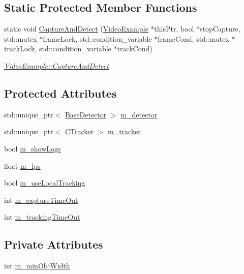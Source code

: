 \subsection*{Static Protected Member Functions}
\begin{DoxyCompactItemize}
\item 
static void \mbox{\hyperlink{class_video_example_ace8617201da40b6e230bd6c049b48aa0}{Capture\+And\+Detect}} (\mbox{\hyperlink{class_video_example}{Video\+Example}} $\ast$this\+Ptr, bool $\ast$stop\+Capture, std\+::mutex $\ast$frame\+Lock, std\+::condition\+\_\+variable $\ast$frame\+Cond, std\+::mutex $\ast$track\+Lock, std\+::condition\+\_\+variable $\ast$track\+Cond)
\begin{DoxyCompactList}\small\item\em \mbox{\hyperlink{class_video_example_ace8617201da40b6e230bd6c049b48aa0}{Video\+Example\+::\+Capture\+And\+Detect}}. \end{DoxyCompactList}\end{DoxyCompactItemize}
\subsection*{Protected Attributes}
\begin{DoxyCompactItemize}
\item 
std\+::unique\+\_\+ptr$<$ \mbox{\hyperlink{class_base_detector}{Base\+Detector}} $>$ \mbox{\hyperlink{class_video_example_a00fee4b18b68d605b87051f3bdaa1c92}{m\+\_\+detector}}
\item 
std\+::unique\+\_\+ptr$<$ \mbox{\hyperlink{class_c_tracker}{C\+Tracker}} $>$ \mbox{\hyperlink{class_video_example_a7c58cd8c883981b2e645d1a3d8edf76a}{m\+\_\+tracker}}
\item 
bool \mbox{\hyperlink{class_video_example_af3bfe51e3e1452bb084016602c668463}{m\+\_\+show\+Logs}}
\item 
float \mbox{\hyperlink{class_video_example_ae8110012f8d57f39d6355377cf20fb27}{m\+\_\+fps}}
\item 
bool \mbox{\hyperlink{class_video_example_a951ee017c4fbb180dfc965a9a35ac69f}{m\+\_\+use\+Local\+Tracking}}
\item 
int \mbox{\hyperlink{class_video_example_aea3c9dd66a3464fab8c61a838aff0ccf}{m\+\_\+capture\+Time\+Out}}
\item 
int \mbox{\hyperlink{class_video_example_a47c8dd1d6ec7e8e18a8f7d92536c53a2}{m\+\_\+tracking\+Time\+Out}}
\end{DoxyCompactItemize}
\subsection*{Private Attributes}
\begin{DoxyCompactItemize}
\item 
int \mbox{\hyperlink{class_motion_detector_example_a1ea131c2071f3a7dd87b6c47cdaf997e}{m\+\_\+min\+Obj\+Width}}
\end{DoxyCompactItemize}


